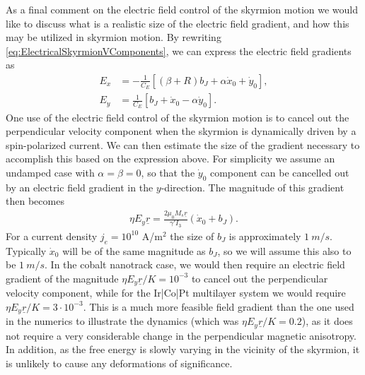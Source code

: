 As a final comment on the electric field control of the skyrmion motion we would like to discuss what is a realistic size of the electric field gradient, and how this may be utilized in skyrmion motion. By rewriting \eqref{eq:ElectricalSkyrmionVComponents}, we can express the electric field gradients as
\begin{subequations}
\begin{align}
    E_x &= -\frac{1}{C_E}\left[\left(\beta+R\right)b_J + \alpha\dot{x}_0+\dot{y}_0\right], \\
    E_y &= \frac{1}{C_E}\left[b_J+\dot{x}_0-\alpha\dot{y}_0\right].
\end{align}
\end{subequations}
One use of the electric field control of the skyrmion motion is to cancel out the perpendicular velocity component when the skyrmion is dynamically driven by a spin-polarized current. We can then estimate the size of the gradient necessary to accomplish this based on the expression above. For simplicity we assume an undamped case with $\alpha=\beta=0$, so that the $\dot{y}_0$ component can be cancelled out by an electric field gradient in the $y$-direction. The magnitude of this gradient then becomes
\begin{align}
    \eta E_y\underline{r} = \frac{2\mu_0M_s\underline{r}}{\gamma' I_3}\left(\dot{x}_0+b_J\right).
\end{align}
For a current density $j_e = 10^{10}$ A/m$^2$ the size of $b_J$ is approximately $\SI{1}{m/s}$. Typically $\dot{x}_0$ will be of the same magnitude as $b_J$, so we will assume this also to be $\SI{1}{m/s}$. In the cobalt nanotrack case, we would then require an electric field gradient of the magnitude $\eta E_y\underline{r}/K = 10^{-3}$ to cancel out the perpendicular velocity component, while for the Ir|Co|Pt multilayer system we would require $\eta E_y\underline{r}/K = 3\cdot10^{-3}$. This is a much more feasible field gradient than the one used in the numerics to illustrate the dynamics (which was $\eta E_y\underline{r}/K = 0.2$), as it does not require a very considerable change in the perpendicular magnetic anisotropy. In addition, as the free energy is slowly varying in the vicinity of the skyrmion, it is unlikely to cause any deformations of significance. 